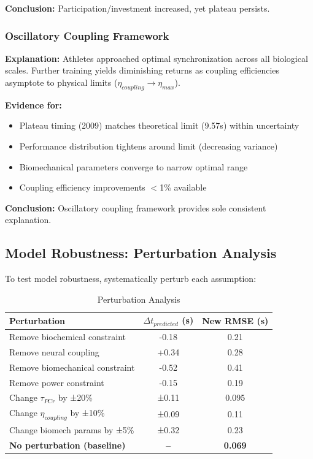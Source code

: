 \documentclass[10pt]{article}
\begin{document}
\textbf{Conclusion:} Participation/investment increased, yet plateau persists.

\subsubsection{Oscillatory Coupling Framework}

\textbf{Explanation:} Athletes approached optimal synchronization across all biological scales. Further training yields diminishing returns as coupling efficiencies asymptote to physical limits ($\eta_{coupling} \to \eta_{max}$).

\textbf{Evidence for:}
\begin{itemize}
\item Plateau timing (2009) matches theoretical limit (9.57s) within uncertainty
\item Performance distribution tightens around limit (decreasing variance)
\item Biomechanical parameters converge to narrow optimal range
\item Coupling efficiency improvements $<$1\% available
\end{itemize}

\textbf{Conclusion:} Oscillatory coupling framework provides sole consistent explanation.

\subsection{Model Robustness: Perturbation Analysis}

To test model robustness, systematically perturb each assumption:

\begin{table}[H]
\centering
\caption{Perturbation Analysis}
\begin{tabular}{lcc}
\toprule
Perturbation & $\Delta t_{predicted}$ (s) & New RMSE (s) \\
\midrule
Remove biochemical constraint & -0.18 & 0.21 \\
Remove neural coupling & +0.34 & 0.28 \\
Remove biomechanical constraint & -0.52 & 0.41 \\
Remove power constraint & -0.15 & 0.19 \\
\midrule
Change $\tau_{PCr}$ by ±20\% & ±0.11 & 0.095 \\
Change $\eta_{coupling}$ by ±10\% & ±0.09 & 0.11 \\
Change biomech params by ±5\% & ±0.32 & 0.23 \\
\midrule
\textbf{No perturbation (baseline)} & \textbf{--} & \textbf{0.069} \\
\bottomrule
\end{tabular}
\end{table}
\end{document}

